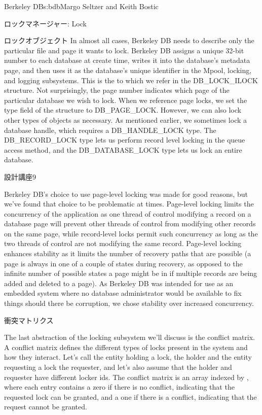 \begin{aosachapter}{Berkeley DB}{s:bdb}{Margo Seltzer and Keith Bostic}
\begin{aosasect1}{ロックマネージャー: Lock}
\begin{aosasect2}{ロックオブジェクト}
In almost all cases, Berkeley DB needs to describe only the particular
file and page it wants to lock. Berkeley DB assigns a unique 32-bit
number to each database at create time, writes it into the database's
metadata page, and then uses it as the database's unique identifier
in the Mpool, locking, and logging subsystems. This is the
 to which we refer in the DB\_LOCK\_ILOCK structure. Not
surprisingly, the page number indicates which page of the particular
database we wish to lock.  When we reference page locks, we set the
type field of the structure to DB\_PAGE\_LOCK\@.  However, we can also
lock other types of objects as necessary. As mentioned earlier, we
sometimes lock a database handle, which requires a DB\_HANDLE\_LOCK
type. The DB\_RECORD\_LOCK type lets us perform record level locking
in the queue access method, and the DB\_DATABASE\_LOCK type lets us
lock an entire database. 
\hspace{-.5cm}
\begin{aosabox}{設計講座9}

Berkeley DB's choice to use page-level locking was made for good
reasons, but we've found that choice to be problematic at times. Page-level locking
limits the concurrency of the application as one thread of control
modifying a record on a database page will prevent other threads of
control from modifying other records on the same page, while
record-level locks permit such concurrency as long as the two threads
of control are not modifying the same record.  Page-level locking
enhances stability as it limits the number of recovery paths that are
possible (a page is always in one of a couple of states during
recovery, as opposed to the infinite number of possible states a page
might be in if multiple records are being added and deleted to a
page). As Berkeley DB was intended for use as an embedded system where
no database administrator would be available to fix things should
there be corruption, we chose stability over increased concurrency.

\end{aosabox}

\end{aosasect2}

\begin{aosasect2}{衝突マトリクス}

The last abstraction of the locking subsystem we'll discuss is the
conflict matrix. A conflict matrix defines the different types of
locks present in the system and how they interact. Let's call the
entity holding a lock, the holder and the entity requesting a lock the
requester, and let's also assume that the holder and requester have
different locker ids.  The conflict matrix is an array indexed by
\code{[requester][holder]}, where each entry contains a zero if there
is no conflict, indicating that the requested lock can be granted, and
a one if there is a conflict, indicating that the request cannot be
granted.


\end{aosasect2}
\end{aosasect1}
\end{aosachapter}

